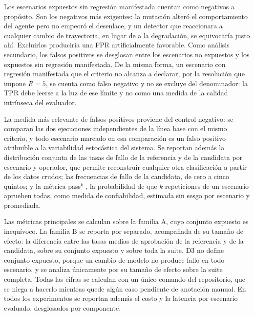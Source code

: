 Los escenarios expuestos sin regresión manifestada cuentan como negativos a propósito. Son los negativos más exigentes: la mutación alteró el comportamiento del agente pero no empeoró el desenlace, y un detector que reaccionara a cualquier cambio de trayectoria, en lugar de a la degradación, se equivocaría justo ahí. Excluirlos produciría una FPR artificialmente favorable. Como análisis secundario, los falsos positivos se desglosan entre los escenarios no expuestos y los expuestos sin regresión manifestada. De la misma forma, un escenario con regresión manifestada que el criterio no alcanza a declarar, por la resolución que impone $R = 5$, se cuenta como falso negativo y no se excluye del denominador: la TPR debe leerse a la luz de ese límite y no como una medida de la calidad intrínseca del evaluador.
\par
La medida más relevante de falsos positivos proviene del control negativo: se comparan las dos ejecuciones independientes de la línea base con el mismo criterio, y todo escenario marcado en esa comparación es un falso positivo atribuible a la variabilidad estocástica del sistema. Se reportan además la distribución conjunta de las tasas de fallo de la referencia y de la candidata por escenario y operador, que permite reconstruir cualquier otra clasificación a partir de los datos crudos; las frecuencias de fallo de la candidata, de cero a cinco quintos; y la métrica pass$^k$ \cite{yao2024taubench}, la probabilidad de que $k$ repeticiones de un escenario aprueben todas, como medida de confiabilidad, estimada sin sesgo por escenario y promediada.
\par
Las métricas principales se calculan sobre la familia A, cuyo conjunto expuesto es inequívoco. La familia B se reporta por separado, acompañada de su tamaño de efecto: la diferencia entre las tasas medias de aprobación de la referencia y de la candidata, sobre su conjunto expuesto y sobre toda la suite. D3 no define conjunto expuesto, porque un cambio de modelo no produce fallo en todo escenario, y se analiza únicamente por su tamaño de efecto sobre la suite completa. Todas las cifras se calculan con un único comando del repositorio, que se niega a hacerlo mientras quede algún caso pendiente de anotación manual. En todos los experimentos se reportan además el costo y la latencia por escenario evaluado, desglosados por componente.
\par


